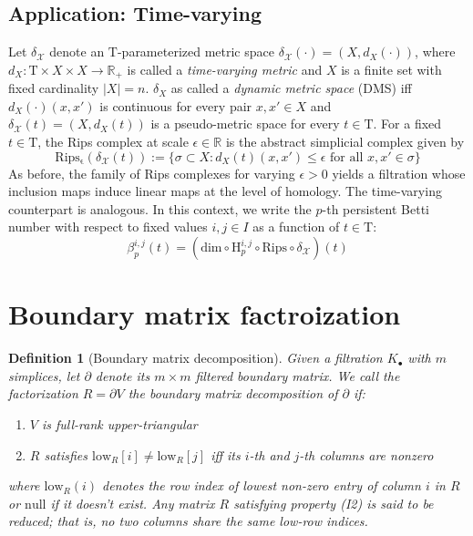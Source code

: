 \documentclass[10pt]{article}
\newcommand{\+}{%
	\raisebox{0.18ex}{\scaleobj{0.55}{+}}
}
\newtheorem{definition}{Definition}
\begin{document}


\subsection{Application: Time-varying }
Let $\delta_\mathcal{X}$ denote an $\mathrm{T}$-parameterized metric space $\delta_\mathcal{X}(\cdot) = ( X, d_X(\cdot) )$, where $d_X: \mathrm{T} \times X \times X \to \mathbb{R}_+$ is called a \emph{time-varying metric}  and $X$ is a finite set with fixed cardinality $\lvert X \rvert = n$. $\delta_X$ as called a \emph{dynamic metric space} (DMS) iff $d_X(\cdot)(x, x')$ is continuous for every pair $x, x' \in X$ and $\delta_\mathcal{X}(t) = (X, d_X(t))$ is a pseudo-metric space for every $t \in \mathrm{T}$. 
For a fixed $t \in \mathrm{T}$, the Rips complex at scale $\epsilon \in \mathbb{R}$ is the abstract simplicial complex given by 
\begin{equation}
	\mathrm{Rips_{\epsilon}}(\delta_\mathcal{X}(t)) := \{ \sigma \subset X : d_X(t)(x, x') \leq \epsilon \text{ for all } x, x' \in \sigma \}
\end{equation}
\noindent As before, the family of Rips complexes for varying $\epsilon > 0$ yields a filtration whose inclusion maps induce linear maps at the level of homology. The time-varying counterpart is analogous.  
In this context, we write the $p$-th persistent Betti number with respect to fixed values $i,j \in I$ as a function of $t \in \mathrm{T}$: 
\begin{equation}
\beta_{p}^{i,j}(t) = \left(\mathrm{dim} \circ \mathrm{H}_p^{i,j} \circ \mathrm{Rips} \circ \delta_\mathcal{X} \right)(t)
\end{equation}


\appendix

\section{Boundary matrix factroization}
\begin{definition}[Boundary matrix decomposition]
Given a filtration $K_\bullet$ with $m$ simplices, let $\partial$ denote its $m \times m$ filtered boundary matrix. We call the factorization $R = \partial V$ the \emph{boundary matrix decomposition} of $\partial$ if:
 \begin{enumerate}[labelsep=3pt, topsep=3pt, itemsep=-0.10ex,parsep=1.2ex]
 	\item[I1.] $V$ is full-rank upper-triangular
 	\item[I2.] $R$ satisfies $\mathrm{low}_R[i] \neq \mathrm{low}_R[j]$ iff its $i$-th and $j$-th columns are nonzero
 	\end{enumerate} 
 	where $\mathrm{low}_R(i)$ denotes the row index of lowest non-zero entry of column $i$ in $R$ or $\mathrm{null}$ if it doesn't exist. Any matrix $R$ satisfying property (I2) is said to be  \emph{reduced}; that is, no two columns share the same low-row indices.
\end{definition}
\end{document}
